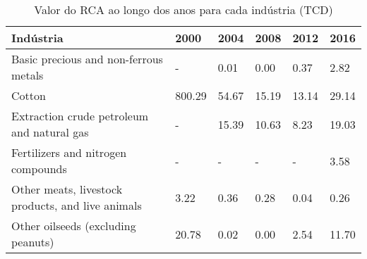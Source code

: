 \begin{table}
\centering
\caption{Valor do RCA ao longo dos anos para cada indústria (TCD)}
\label{tab:ex3-tempo-TCD}
\begin{tabular}{p{6cm}p{1.5cm}p{1.5cm}p{1.5cm}p{1.5cm}p{1.5cm}}
\toprule
                                        Indústria &   2000 &  2004 &  2008 &  2012 &  2016 \\
\midrule
            Basic precious and non-ferrous metals &      - &  0.01 &  0.00 &  0.37 &  2.82 \\
                                           Cotton & 800.29 & 54.67 & 15.19 & 13.14 & 29.14 \\
       Extraction crude petroleum and natural gas &      - & 15.39 & 10.63 &  8.23 & 19.03 \\
               Fertilizers and nitrogen compounds &      - &     - &     - &     - &  3.58 \\
Other meats, livestock products, and live animals &   3.22 &  0.36 &  0.28 &  0.04 &  0.26 \\
               Other oilseeds (excluding peanuts) &  20.78 &  0.02 &  0.00 &  2.54 & 11.70 \\
\bottomrule
\end{tabular}
\end{table}
